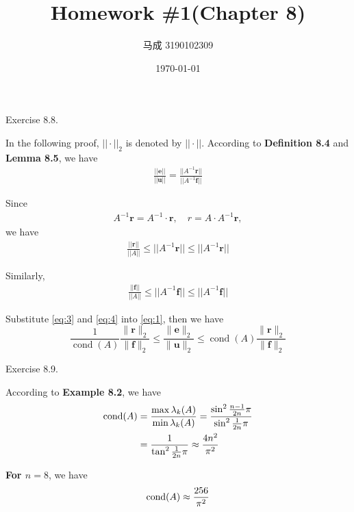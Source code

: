 \documentclass{homework}
\author{马成 3190102309}
\date{\today}
\title{Homework \#1(Chapter 8)}
\begin{document}
 \maketitle

\question Exercise 8.8.

	In the following proof, $||\cdot||_2$ is denoted by $||\cdot||$. According to \textbf{Definition 8.4} and \textbf{Lemma 8.5}, we have
	\begin{eqnarray}\label{eq:1}
		\frac{||\textbf{e}||}{||\textbf{u}||} = \frac{||A^{-1} \textbf{r}||}{||A^{-1} \textbf{f}||}
	\end{eqnarray}
	
	Since
	\begin{eqnarray}\label{eq:2}
		A^{-1} \textbf{r} = A^{-1} \cdot \textbf{r},\quad r = A \cdot A^{-1}\textbf{r},
	\end{eqnarray}
	we have
	\begin{eqnarray}\label{eq:3}
		\frac{||\textbf{r}||}{||A||} \leq ||A^{-1}\textbf{r}|| \leq ||A^{-1} \textbf{r}||
	\end{eqnarray}
	
	Similarly,
	\begin{eqnarray}\label{eq:4}
		\frac{||\textbf{f}||}{||A||} \leq ||A^{-1}\textbf{f}|| \leq ||A^{-1} \textbf{f}||
	\end{eqnarray}
	
	Substitute \ref{eq:3} and \ref{eq:4} into \ref{eq:1}, then we have 
	\begin{equation}
		\frac{1}{\operatorname{cond}(A)} \frac{\|\mathbf{r}\|_{2}}{\|\mathbf{f}\|_{2}} \leq \frac{\|\mathbf{e}\|_{2}}{\|\mathbf{u}\|_{2}} \leq \operatorname{cond}(A) \frac{\|\mathbf{r}\|_{2}}{\|\mathbf{f}\|_{2}}
	\end{equation}

\question Exercise 8.9.

	According to \textbf{Example 8.2}, we have
	\begin{eqnarray}
		\begin{aligned}
			\text{cond}(A) &= \frac{\max \lambda_k(A)}{\min \lambda_k(A)} = \frac{\sin^2 \frac{n-1}{2n}\pi}{\sin^2 \frac{1}{2n}\pi} \\
			&= \frac{1}{\tan^2 \frac{1}{2n} \pi } \approx \frac{4n^2}{\pi^2}
		\end{aligned}
	\end{eqnarray}

	\textbf{For $n = 8$}, we have
	\begin{eqnarray}
		\text{cond}(A) \approx \frac{256}{\pi^2}
	\end{eqnarray}
	
\end{document}
